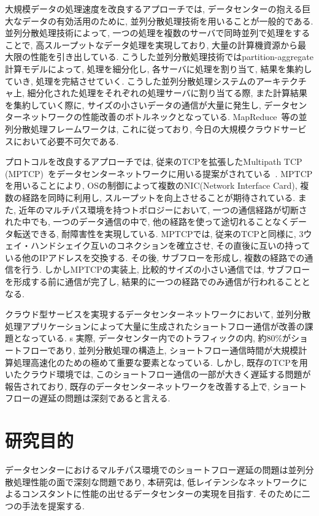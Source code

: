大規模データの処理速度を改良するアプローチでは, データセンターの抱える巨大なデータの有効活用のために, 並列分散処理技術を用いることが一般的である. 
並列分散処理技術によって, 一つの処理を複数のサーバで同時並列で処理をすることで,
高スループットなデータ処理を実現しており, 大量の計算機資源から最大限の性能を引き出している. 
こうした並列分散処理技術ではpartition-aggregate計算モデルによって, 処理を細分化し, 各サーバに処理を割り当て, 結果を集約していき,
処理を完結させていく. 
こうした並列分散処理システムのアーキテクチャ上, 細分化された処理をそれぞれの処理サーバに割り当てる際, また計算結果を集約していく際に, 
サイズの小さいデータの通信が大量に発生し, データセンターネットワークの性能改善のボトルネックとなっている. 
MapReduce~\cite{mapreduce}等の並列分散処理フレームワークは,
これに従っており, 今日の大規模クラウドサービスにおいて必要不可欠である.

プロトコルを改良するアプローチでは, 
従来のTCPを拡張したMultipath TCP
(MPTCP)~\cite{mptcp}をデータセンターネットワークに用いる提案がされている~\cite{fattree}.
MPTCPを用いることにより, OSの制御によって複数のNIC(Network Interface Card), 複数の経路を同時に利用し,
スループットを向上させることが期待されている.
また, 近年のマルチパス環境を持つトポロジーにおいて, 一つの通信経路が切断された中でも,
一つのデータ通信の中で, 他の経路を使って途切れることなくデータ転送できる, 耐障害性を実現している. 
MPTCPでは, 従来のTCPと同様に, 3ウェイ・ハンドシェイク互いのコネクションを確立させ, その直後に互いの持っている他のIPアドレスを交換する. 
その後, サブフローを形成し, 複数の経路での通信を行う. 
しかしMPTCPの実装上, 比較的サイズの小さい通信では, サブフローを形成する前に通信が完了し, 結果的に一つの経路でのみ通信が行われることとなる. 

クラウド型サービスを実現するデータセンターネットワークにおいて,
並列分散処理アプリケーションによって大量に生成されたショートフロー通信が改善の課題となっている\cite{improving}. s
実際, データセンター内でのトラフィックの内, 約80\%がショートフローであり\cite{traffic}, 並列分散処理の構造上,
ショートフロー通信時間が大規模計算処理高速化のための極めて重要な要素となっている. 
しかし, 既存のTCPを用いたクラウド環境では, このショートフロー通信の一部が大きく遅延する問題が報告されており,
既存のデータセンターネットワークを改善する上で, ショートフローの遅延の問題は深刻であると言える\cite{improving, rtt}.


\section{研究目的}
データセンターにおけるマルチパス環境でのショートフロー遅延の問題は並列分散処理性能の面で深刻な問題であり,
本研究は, 低レイテンシなネットワークによるコンスタントに性能の出せるデータセンターの実現を目指す.
そのために二つの手法を提案する. 

